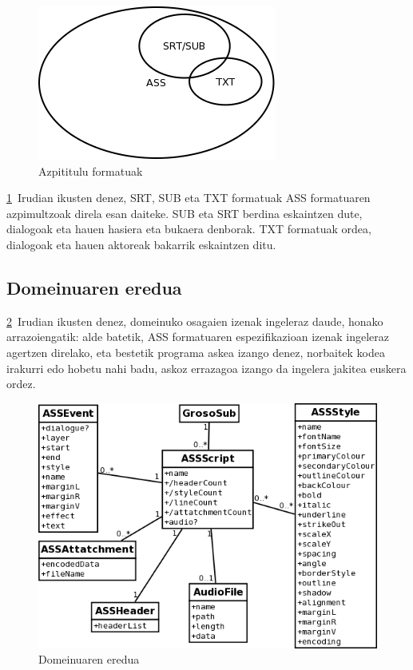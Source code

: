 \begin{figure}[htp]
\begin{center}
\includegraphics[scale=0.5]{Pictures/Chapter4/Analisia/formatuak.png}
\caption{Azpititulu formatuak}
\label{formatuak}
\end{center}
\end{figure}

\ref{formatuak}~Irudian ikusten denez, SRT, SUB eta TXT formatuak ASS formatuaren azpimultzoak direla esan daiteke. SUB eta SRT berdina eskaintzen dute, dialogoak eta hauen hasiera eta bukaera denborak. TXT formatuak ordea, dialogoak eta hauen aktoreak bakarrik eskaintzen ditu.
\subsection{Domeinuaren eredua}
\ref{de}~Irudian ikusten denez, domeinuko osagaien izenak ingeleraz daude, honako arrazoiengatik: alde batetik, ASS formatuaren espezifikazioan izenak ingeleraz agertzen direlako\cite{gu:ass}, eta bestetik programa askea izango denez, norbaitek kodea irakurri edo hobetu nahi badu, askoz errazagoa izango da ingelera jakitea euskera ordez.
\begin{figure}[htp]
\begin{center}
\includegraphics[scale=0.6]{Pictures/Chapter4/Analisia/DE.png}
\caption{Domeinuaren eredua}
\label{de}
\end{center}
\end{figure}

